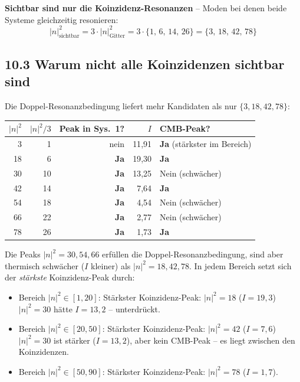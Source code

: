 \textbf{Sichtbar sind nur die Koinzidenz-Resonanzen} -- Moden bei
denen beide Systeme gleichzeitig resonieren:
\[
  |n|^2_\mathrm{sichtbar}
  = 3 \cdot |n|^2_\mathrm{Gitter}
  = 3 \cdot \{1,\,6,\,14,\,26\}
  = \{3,\,18,\,42,\,78\}
\]

\subsection*{10.3 Warum nicht alle Koinzidenzen sichtbar sind}

Die Doppel-Resonanzbedingung liefert mehr Kandidaten als nur
$\{3, 18, 42, 78\}$:

\begin{center}
\begin{tabular}{rrrrl}
\toprule
$|n|^2$ & $|n|^2/3$ & Peak in Sys.~1? & $I$ & CMB-Peak? \\
\midrule
3  & 1  & nein & 11{,}91 & \textbf{Ja} (stärkster im Bereich) \\
18 & 6  & \textbf{Ja} & 19{,}30 & \textbf{Ja} \\
30 & 10 & \textbf{Ja} & 13{,}25 & Nein (schwächer) \\
42 & 14 & \textbf{Ja} & 7{,}64  & \textbf{Ja} \\
54 & 18 & \textbf{Ja} & 4{,}54  & Nein (schwächer) \\
66 & 22 & \textbf{Ja} & 2{,}77  & Nein (schwächer) \\
78 & 26 & \textbf{Ja} & 1{,}73  & \textbf{Ja} \\
\bottomrule
\end{tabular}
\end{center}

Die Peaks $|n|^2 = 30, 54, 66$ erfüllen die Doppel-Resonanzbedingung,
sind aber thermisch schwächer ($I$ kleiner) als $|n|^2 = 18, 42, 78$.
In jedem Bereich setzt sich der \emph{stärkste} Koinzidenz-Peak durch:

\begin{itemize}
  \item Bereich $|n|^2 \in [1, 20]$:\quad
        Stärkster Koinzidenz-Peak: $|n|^2 = 18$ ($I = 19{,}3$) \\
        \hphantom{Bereich $|n|^2 \in [1, 20]$:\quad}
        $|n|^2 = 30$ hätte $I = 13{,}2$ -- unterdrückt.
  \item Bereich $|n|^2 \in [20, 50]$:\quad
        Stärkster Koinzidenz-Peak: $|n|^2 = 42$ ($I = 7{,}6$) \\
        \hphantom{Bereich $|n|^2 \in [20, 50]$:\quad}
        $|n|^2 = 30$ ist stärker ($I = 13{,}2$), aber kein CMB-Peak --
        es liegt zwischen den Koinzidenzen.
  \item Bereich $|n|^2 \in [50, 90]$:\quad
        Stärkster Koinzidenz-Peak: $|n|^2 = 78$ ($I = 1{,}7$).
\end{itemize}


